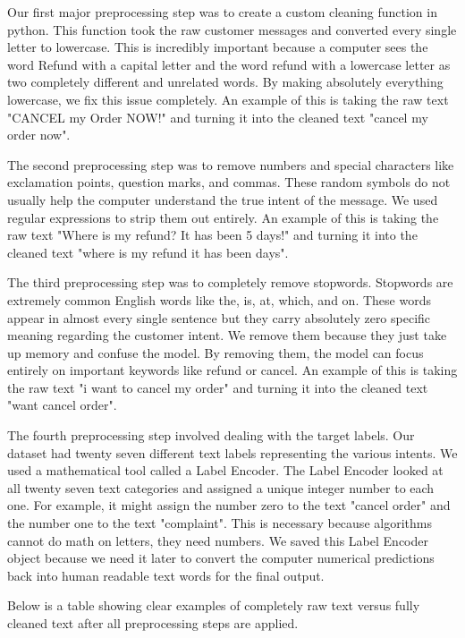 \documentclass[12pt]{article}
\begin{document}
Our first major preprocessing step was to create a custom cleaning function in python. This function took the raw customer messages and converted every single letter to lowercase. This is incredibly important because a computer sees the word Refund with a capital letter and the word refund with a lowercase letter as two completely different and unrelated words. By making absolutely everything lowercase, we fix this issue completely. An example of this is taking the raw text "CANCEL my Order NOW!" and turning it into the cleaned text "cancel my order now". 

The second preprocessing step was to remove numbers and special characters like exclamation points, question marks, and commas. These random symbols do not usually help the computer understand the true intent of the message. We used regular expressions to strip them out entirely. An example of this is taking the raw text "Where is my refund? It has been 5 days!" and turning it into the cleaned text "where is my refund it has been days".

The third preprocessing step was to completely remove stopwords. Stopwords are extremely common English words like the, is, at, which, and on. These words appear in almost every single sentence but they carry absolutely zero specific meaning regarding the customer intent. We remove them because they just take up memory and confuse the model. By removing them, the model can focus entirely on important keywords like refund or cancel. An example of this is taking the raw text "i want to cancel my order" and turning it into the cleaned text "want cancel order". 

The fourth preprocessing step involved dealing with the target labels. Our dataset had twenty seven different text labels representing the various intents. We used a mathematical tool called a Label Encoder. The Label Encoder looked at all twenty seven text categories and assigned a unique integer number to each one. For example, it might assign the number zero to the text "cancel order" and the number one to the text "complaint". This is necessary because algorithms cannot do math on letters, they need numbers. We saved this Label Encoder object because we need it later to convert the computer numerical predictions back into human readable text words for the final output. 

Below is a table showing clear examples of completely raw text versus fully cleaned text after all preprocessing steps are applied.
\end{document}
